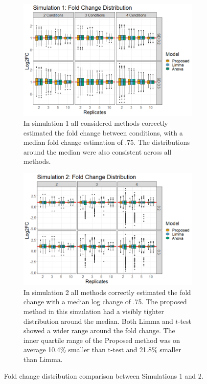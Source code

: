 \documentclass{mcp}
\begin{document}
\begin{figure}[h!]
\centering
 \begin{subfigure}{\textwidth}
 \centering
	\includegraphics[width=.8\textwidth]{sim_new/sim1_FC_boxplot}
	\caption{In simulation 1 all considered methods correctly estimated the fold change between conditions, with a median fold change estimation of .75. The distributions around the median were also consistent across all methods.}
 \end{subfigure}
 \begin{subfigure}{\textwidth}
  \centering
	\includegraphics[width=.8\textwidth]{sim_new/sim3_FC_boxplot}
	\caption{In simulation 2 all methods correctly estimated the fold change with a median log change of .75. The proposed method in this simulation had a visibly tighter distribution around the median. Both Limma and $t$-test showed a wider range around the fold change. The inner quartile range of the Proposed method was on average 10.4\% smaller than t-test and 21.8\% smaller than Limma.}
 \end{subfigure}
\caption{Fold change distribution comparison between Simulations 1 and 2.}
\label{fig:fc_boxplot}
\end{figure}
\end{document}
